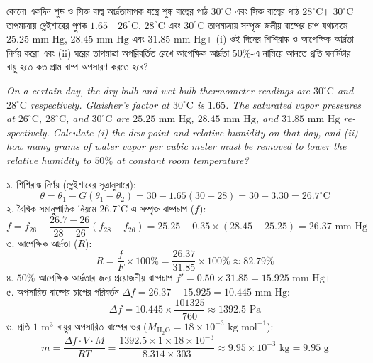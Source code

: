 \documentclass[12pt, a4paper]{article}
\begin{document}
\vspace{1.5em}

\begin{tcolorbox}[questionbox={প্রশ্ন (Question) 5}]
\noindent
কোনো একদিন শুষ্ক ও সিক্ত বাল্ব আর্দ্রতামাপক যন্ত্রে শুষ্ক বাল্বের পাঠ $30^\circ\text{C}$ এবং সিক্ত বাল্বের পাঠ $28^\circ\text{C}$। $30^\circ\text{C}$ তাপমাত্রায় গ্লেইশারের গুণক $1.65$। $26^\circ\text{C}$, $28^\circ\text{C}$ এবং $30^\circ\text{C}$ তাপমাত্রায় সম্পৃক্ত জলীয় বাষ্পের চাপ যথাক্রমে $25.25\text{ mm Hg}$, $28.45\text{ mm Hg}$ এবং $31.85\text{ mm Hg}$। (i) ওই দিনের শিশিরাঙ্ক ও আপেক্ষিক আর্দ্রতা নির্ণয় করো এবং (ii) ঘরের তাপমাত্রা অপরিবর্তিত রেখে আপেক্ষিক আর্দ্রতা $50\%$-এ নামিয়ে আনতে প্রতি ঘনমিটার বায়ু হতে কত গ্রাম বাষ্প অপসারণ করতে হবে?

\vspace{0.8em}
\begin{english}
\noindent\textit{\color{darkgray}
On a certain day, the dry bulb and wet bulb thermometer readings are $30^\circ\text{C}$ and $28^\circ\text{C}$ respectively. Glaisher's factor at $30^\circ\text{C}$ is $1.65$. The saturated vapor pressures at $26^\circ\text{C}$, $28^\circ\text{C}$, and $30^\circ\text{C}$ are $25.25\text{ mm Hg}$, $28.45\text{ mm Hg}$, and $31.85\text{ mm Hg}$ respectively. Calculate (i) the dew point and relative humidity on that day, and (ii) how many grams of water vapor per cubic meter must be removed to lower the relative humidity to $50\%$ at constant room temperature?
}
\end{english}
\end{tcolorbox}

\vspace{1em}

\begin{tcolorbox}[solutionbox={সমাধান (Solution)}]
\noindent
১. শিশিরাঙ্ক নির্ণয় (গ্লেইশারের সূত্রানুসারে):
\[ \theta = \theta_1 - G(\theta_1 - \theta_2) = 30 - 1.65(30 - 28) = 30 - 3.30 = 26.7^\circ\text{C} \]
২. রৈখিক সমানুপাতিক নিয়মে $26.7^\circ\text{C}$-এ সম্পৃক্ত বাষ্পচাপ ($f$):
\[ f = f_{26} + \frac{26.7 - 26}{28 - 26} (f_{28} - f_{26}) = 25.25 + 0.35 \times (28.45 - 25.25) = 26.37\text{ mm Hg} \]
৩. আপেক্ষিক আর্দ্রতা ($R$):
\[ R = \frac{f}{F} \times 100\% = \frac{26.37}{31.85} \times 100\% \approx 82.79\% \]
৪. $50\%$ আপেক্ষিক আর্দ্রতার জন্য প্রয়োজনীয় বাষ্পচাপ $f' = 0.50 \times 31.85 = 15.925\text{ mm Hg}$। \\
৫. অপসারিত বাষ্পের চাপের পরিবর্তন $\Delta f = 26.37 - 15.925 = 10.445\text{ mm Hg}$:
\[ \Delta f = 10.445 \times \frac{101325}{760} \approx 1392.5\text{ Pa} \]
৬. প্রতি $1\text{ m}^3$ বায়ুর অপসারিত বাষ্পের ভর ($M_{\text{H}_2\text{O}} = 18 \times 10^{-3}\text{ kg mol}^{-1}$):
\[ m = \frac{\Delta f \cdot V \cdot M}{R T} = \frac{1392.5 \times 1 \times 18 \times 10^{-3}}{8.314 \times 303} \approx 9.95 \times 10^{-3}\text{ kg} = 9.95\text{ g} \]
\end{tcolorbox}
\end{document}
